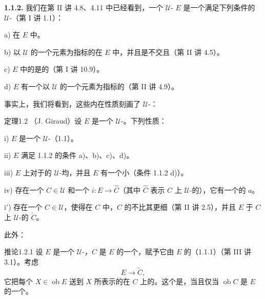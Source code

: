 \textbf{1.1.2.} 我们在第 II 讲 4.8、4.11 中已经看到，一个 $\mathcal U$- $E$ 是一个满足下列条件的 $\mathcal U$-（第 I 讲 1.1）：

 a) 在 $E$ 中。

 b) 以 $\mathcal U$ 的一个元素为指标的在 $E$ 中，并且是不交且（第 II 讲 4.5）。

 c) $E$ 中的是的（第 I 讲 10.9）。

 d) $E$ 有一个以 $\mathcal U$ 的一个元素为指标的（第 II 讲 4.9）。

事实上，我们将看到，这些内在性质刻画了 $\mathcal U$-：
\begin{SGAresult}{定理}{1.2}
（J. Giraud）设 $E$ 是一个 $\mathcal U$-。下列性质：

 i) $E$ 是一个 $\mathcal U$-（1.1）。

 ii) $E$ 满足 1.1.2 的条件 a)、b)、c)、d)。

 iii) $E$ 上对于的 $\mathcal U$-均，并且 $E$ 有一个小（条件 1.1.2 d)）。

 iv) 存在一个 $C\in\mathcal U$ 和一个 $i:E\to\widehat C$（其中 $\widehat C$ 表示 $C$ 上 $\mathcal U$-的），它有一个的 $a$。

 i$'$) 存在一个 $C\in\mathcal U$，使得在 $C$ 中，$C$ 的不比其更细（第 II 讲 2.5），并且 $E$ 于 $C$ 上 $\mathcal U$-的 $\widetilde C$。
\end{SGAresult}
此外：
\begin{SGAresult}{推论}{1.2.1}
设 $E$ 是一个 $\mathcal U$-，$C$ 是 $E$ 的一个，赋予它由 $E$ 的（1.1.1）（第 III 讲 3.1）。考虑
\[
 E\longrightarrow\widetilde C,
\]
它把每个 $X\in\operatorname{ob}E$ 送到 $X$ 所表示的在 $C$ 上的。这个是，当且仅当 $\operatorname{ob}C$ 是 $E$ 的一个。
\end{SGAresult}

